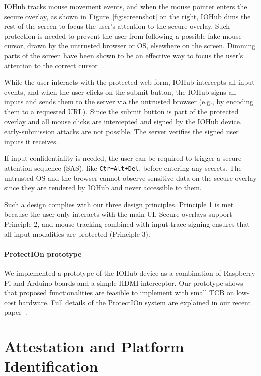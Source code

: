 \documentclass[letterpaper,twocolumn,10pt]{article}
\newcommand{\protection}{\textsf{ProtectIOn}\xspace}
\newcommand{\hub}{\textsf{IOHub}\xspace}
\begin{document}
\hub tracks mouse movement events, and when the mouse pointer enters the secure overlay, as shown in Figure~\ref{fig:screenshot} on the right, \hub dims the rest of the screen to focus the user's attention to the secure overlay. Such protection is needed to prevent the user from following a possible fake mouse cursor, drawn by the untrusted browser or OS, elsewhere on the screen. Dimming parts of the screen have been shown to be an effective way to focus the user's attention to the correct cursor~\cite{huang2012clickjacking}.

While the user interacts with the protected web form, \hub intercepts all input events, and when the user clicks on the submit button, the \hub signs all inputs and sends them to the server via the untrusted browser (e.g., by encoding them to a requested URL). Since the submit button is part of the protected overlay and all mouse clicks are intercepted and signed by the \hub device, early-submission attacks are not possible. The server verifies the signed user inputs it receives. 

If input confidentiality is needed, the user can be required to trigger a secure attention sequence (SAS), like \texttt{Ctr+Alt+Del}, before entering any secrets. The untrusted OS and the browser cannot observe sensitive data on the secure overlay since they are rendered by \hub and never accessible to them.

Such a design complies with our three design principles. Principle 1 is met because the user only interacts with the main UI. Secure overlays support Principle 2, and mouse tracking combined with input trace signing ensures that all input modalities are protected (Principle 3).


\paragraph{\protection prototype} 

We implemented a prototype of the \hub device as a combination of Raspberry Pi and Arduino boards and a simple HDMI interceptor. Our prototype shows that proposed functionalities are feasible to implement with small TCB on low-cost hardware. Full details of the \protection system are explained in our recent paper~\cite{protection}.


\section*{Attestation and Platform Identification}
\end{document}
